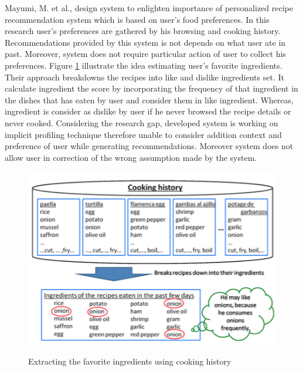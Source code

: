 Mayumi, M. et al.\cite{ueda2011user}, design system to enlighten importance of personalized recipe recommendation system which is based on user’s food preferences. In this research user’s preferences are gathered by his browsing and cooking history. Recommendations provided by this system is not depends on what user ate in past. Moreover, system does not require particular action of user to collect his preferences.  Figure \ref{fig:ch2_ueda2011user} illustrate the idea estimating user’s favorite ingredients. Their approach breakdowns the recipes into like and dislike ingredients set. It calculate ingredient the score by incorporating the frequency of that ingredient in the dishes that has eaten by user and consider them in like ingredient. Whereas, ingredient is consider as dislike by user if he never browsed the recipe details or never cooked. Considering the research gap, developed system is working on implicit profiling technique therefore unable to consider addition context and preference of user while generating recommendations. Moreover system does not allow user in correction of the wrong assumption made by the system. \newline

\begin{figure}[h]
	\centering
	\includegraphics[width=1\linewidth]{figures/ch2_ueda2011user.png}
	\caption{Extracting the favorite ingredients using cooking history}
	\cite{ueda2011user}
	\label{fig:ch2_ueda2011user}
\end{figure}


